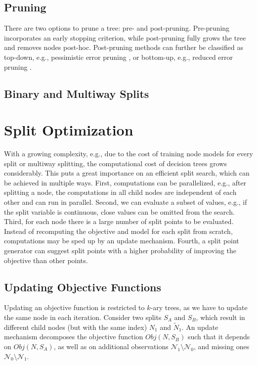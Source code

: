 \documentclass[a4paper, 11pt]{article}
\begin{document}
\subsection{Pruning}

There are two options to prune a tree: pre- and post-pruning. Pre-pruning incorporates an early stopping criterion, while post-pruning fully grows the tree and removes nodes post-hoc. Post-pruning methods can further be classified as top-down, e.g., pessimistic error pruning \cite{quinlan_simplifying}, or bottom-up, e.g., reduced error pruning \cite{quinlan_simplifying}.

\subsection{Binary and Multiway Splits}

\section{Split Optimization}

With a growing complexity, e.g., due to the cost of training node models for every split or multiway splitting, the computational cost of decision trees grows considerably. This puts a great importance on an efficient split search, which can be achieved in multiple ways.
First, computations can be parallelized, e.g., after splitting a node, the computations in all child nodes are independent of each other and can run in parallel.
Second, we can evaluate a subset of values, e.g., if the split variable is continuous, close values can be omitted from the search.
Third, for each node there is a large number of split points to be evaluated. Instead of recomputing the objective and model for each split from scratch, computations may be sped up by an update mechanism. Fourth, a split point generator can suggest split points with a higher probability of improving the objective than other points.

\subsection{Updating Objective Functions}

Updating an objective function is restricted to $k$-ary trees, as we have to update the same node in each iteration. Consider two splits $S_A$ and $S_B$, which result in different child nodes (but with the same index) $N_1$ and $\tilde{N}_1$. An update mechanism decomposes the objective function $Obj(N, S_B)$ such that it depends on $Obj(N, S_A)$, as well as on additional observations $\mathcal{N}_1 \setminus \mathcal{N}_0$, and missing ones $\mathcal{N}_0 \setminus \mathcal{N}_1$. 
\end{document}
